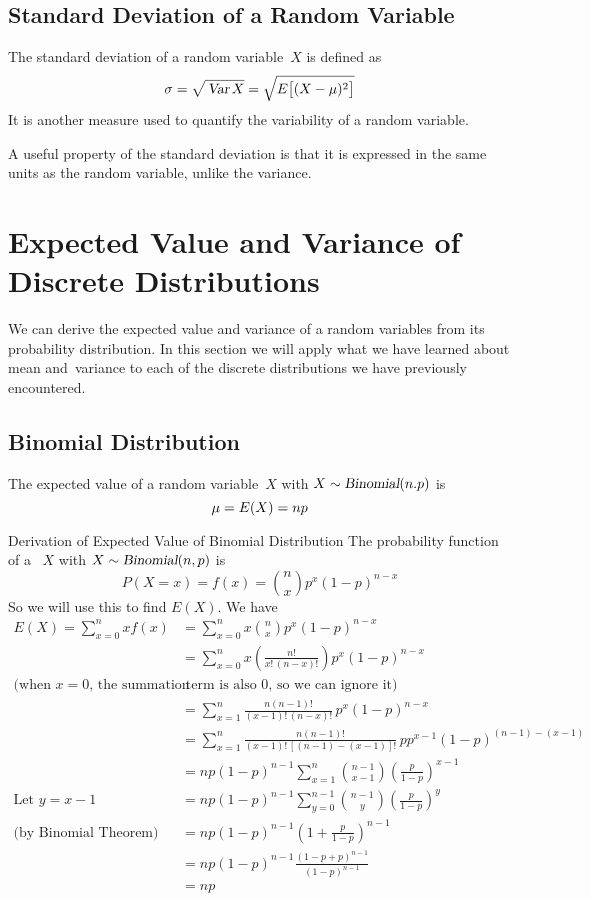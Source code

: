 \subsection{Standard Deviation of a Random Variable}
The standard deviation of a random variable~$X$ is defined as
\[
    \sigma = \sqrt{\mathstrut\operatorname{\textsl{Var}} X} 
    = \sqrt{\mathstrut E\bigl[(X - \mu)^2\bigr]}
\]
It is another measure used to quantify the variability of a random variable.
\begin{info}
A useful property of the standard deviation is that it is expressed in the same units as the random variable, unlike the variance.
\end{info}

\section{Expected Value and Variance of Discrete Distributions}
We can derive the expected value and variance of a random variables from its probability distribution. In this section we will apply what we have learned about mean and~variance to each of the discrete distributions we have previously encountered.
\subsection*{Binomial Distribution}
The expected value of a random variable~$X$ with $X \sim \operatorname{\textsl{Binomial}}(n.p)$ is
\[
    \mu = E(X) = np
\]
\begin{theory}{Derivation of Expected Value of Binomial Distribution}
The probability function of a \rv~$X$ with $X \sim \operatorname{\textsl{Binomial}}(n,p)$ is
\[
    P(X = x) = f(x) = \binom{n}{x}p^x(1-p)^{n-x}
\]
So we will use this to find $E(X)$. We have
\begin{align*}
    E(X) = \sum_{x = 0}^{n} xf(x) 
    &= \sum_{x = 0}^{n} x \binom{n}{x}p^x(1-p)^{n-x} \\
    &= \sum_{x = 0}^{n} x\left(\frac{n!}{x!\,(n-x)!}\right) p^x (1-p)^{n-x} \\
    \text{(when $x = 0$, the summation}&\text{ term is also 0, so we can ignore it)}\\
    &= \sum_{x = 1}^{n} \frac{n(n-1)!}{(x-1)!\,(n-x)!}\,p^x (1-p)^{n-x} \\
    &= \sum_{x = 1}^{n} \frac{n(n-1)!}{(x-1)!\,[(n-1)-(x-1)]!} \,pp^{x-1} (1-p)^{(n-1)-(x-1)} \\
    &= np(1-p)^{n-1} \sum_{x = 1}^{n} \binom{n-1}{x-1} \left(\frac{p}{1-p}\right)^{x-1} \\
    \text{Let $y = x - 1$} \qquad
    &= np(1-p)^{n-1} \sum_{y = 0}^{n-1} \binom{n-1}{y} \left(\frac{p}{1-p}\right)^{y} \\
    \text{(by Binomial Theorem)} \qquad
    &= np(1-p)^{n-1} \left(1 + \frac{p}{1-p}\right)^{n-1} \\
    &= np (1-p)^{n-1} \frac{(1-p+p)^{n-1}}{(1-p)^{n-1}} \\
    &= np
\end{align*}
\end{theory}

